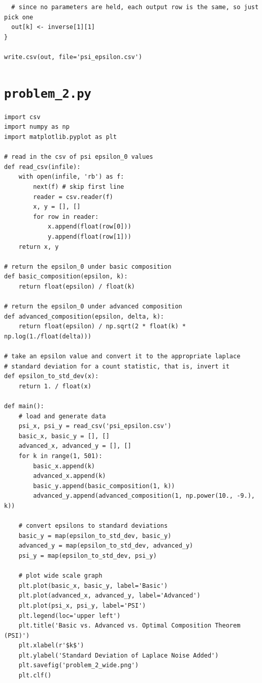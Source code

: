 \documentclass[12pt]{article}
\def\cl{\lstinline}
\begin{document}
\begin{appendices}
{\begin{lstlisting}
  # since no parameters are held, each output row is the same, so just pick one
  out[k] <- inverse[1][1]
}

write.csv(out, file='psi_epsilon.csv')
\end{lstlisting}
}

\newpage

\section{\cl{problem_2.py}}
\label{appendix:problem_2}

\begin{lstlisting}
import csv
import numpy as np
import matplotlib.pyplot as plt

# read in the csv of psi epsilon_0 values
def read_csv(infile):
    with open(infile, 'rb') as f:
        next(f) # skip first line
        reader = csv.reader(f)
        x, y = [], []
        for row in reader:
            x.append(float(row[0]))
            y.append(float(row[1]))
    return x, y

# return the epsilon_0 under basic composition
def basic_composition(epsilon, k):
    return float(epsilon) / float(k)

# return the epsilon_0 under advanced composition
def advanced_composition(epsilon, delta, k):
    return float(epsilon) / np.sqrt(2 * float(k) * np.log(1./float(delta)))

# take an epsilon value and convert it to the appropriate laplace
# standard deviation for a count statistic, that is, invert it
def epsilon_to_std_dev(x):
    return 1. / float(x)

def main():
    # load and generate data
    psi_x, psi_y = read_csv('psi_epsilon.csv')
    basic_x, basic_y = [], []
    advanced_x, advanced_y = [], []
    for k in range(1, 501):
        basic_x.append(k)
        advanced_x.append(k)
        basic_y.append(basic_composition(1, k))
        advanced_y.append(advanced_composition(1, np.power(10., -9.), k))

    # convert epsilons to standard deviations
    basic_y = map(epsilon_to_std_dev, basic_y)
    advanced_y = map(epsilon_to_std_dev, advanced_y)
    psi_y = map(epsilon_to_std_dev, psi_y)

    # plot wide scale graph
    plt.plot(basic_x, basic_y, label='Basic')
    plt.plot(advanced_x, advanced_y, label='Advanced')
    plt.plot(psi_x, psi_y, label='PSI')
    plt.legend(loc='upper left')
    plt.title('Basic vs. Advanced vs. Optimal Composition Theorem (PSI)')
    plt.xlabel(r'$k$')
    plt.ylabel('Standard Deviation of Laplace Noise Added')
    plt.savefig('problem_2_wide.png')
    plt.clf()


\end{lstlisting}
\end{appendices}
\end{document}
